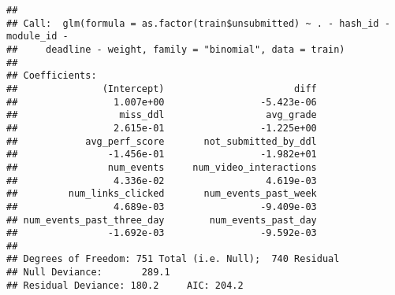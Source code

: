 \documentclass[
]{article}
\begin{document}
\begin{verbatim}
## 
## Call:  glm(formula = as.factor(train$unsubmitted) ~ . - hash_id - module_id - 
##     deadline - weight, family = "binomial", data = train)
## 
## Coefficients:
##               (Intercept)                       diff  
##                 1.007e+00                 -5.423e-06  
##                  miss_ddl                  avg_grade  
##                 2.615e-01                 -1.225e+00  
##            avg_perf_score       not_submitted_by_ddl  
##                -1.456e-01                 -1.982e+01  
##                num_events     num_video_interactions  
##                 4.336e-02                  4.619e-03  
##         num_links_clicked       num_events_past_week  
##                 4.689e-03                 -9.409e-03  
## num_events_past_three_day        num_events_past_day  
##                -1.692e-03                 -9.592e-03  
## 
## Degrees of Freedom: 751 Total (i.e. Null);  740 Residual
## Null Deviance:       289.1 
## Residual Deviance: 180.2     AIC: 204.2
\end{verbatim}
\end{document}
